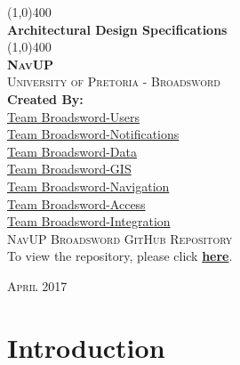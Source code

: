 \documentclass{article}
\begin{document}
	\begin{titlepage}
		\begin{center}

			\line(1,0){400}\\
			[6mm]
			\huge{
				\bfseries Architectural Design Specifications
			}\\
			[2mm]
			\line(1,0){400}\\
			[15mm]
			\textsc{\large{\textbf{NavUP}}}\\
			[4.5mm]
			\textsc{\large University of Pretoria - Broadsword}\\
			[20mm]
			\large{\textbf{Created By:}}\\
			[2mm]
			\large{
				\href{https://github.com/TheZimbo16/COS301-Broadsword-Users}{Team Broadsword-Users}\\
				\href{https://github.com/wanrick/bsword-notification}{Team Broadsword-Notifications}\\
				\href{https://github.com/lyle-univ/cos301-broadsword-data}{Team Broadsword-Data}\\
				\href{https://github.com/sjohandup/SE_BroadSword-GIS}{Team Broadsword-GIS}\\
				\href{https://github.com/AndriesJacobus/COS301Phase3BroadswordNavigation}{Team Broadsword-Navigation}\\
				\href{https://github.com/KeatonPennels/COS-301-Broadsword-Access}{Team Broadsword-Access}\\
				\href{https://github.com/Regan-Koopmans/NavUP-Broadsword}{Team Broadsword-Integration}
			}\\
			[30mm]
			
		\textsc{\Large NavUP Broadsword GitHub Repository}\\[2mm]
			To view the repository, please click 
		\href{https://github.com/Regan-Koopmans/NavUP-Broadsword}{\textbf{here}}. \\[45mm]
		\end{center}
		\begin{flushright}
			\textsc{\large April 2017}
		\end{flushright}
	\end{titlepage}

	\cleardoublepage
	\thispagestyle{empty}
	\tableofcontents
	\cleardoublepage

	\thispagestyle{empty}
	\listoffigures
	\cleardoublepage
	\setcounter{page}{1}
	
	\section{Introduction}\label{sec:intro}
		
\end{document}
